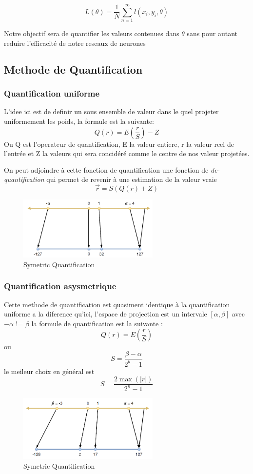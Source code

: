 \documentclass[twoside,twocolumn]{article}
\begin{document}
\[ L(\theta) = \frac{1}{N} \sum_{n=1}^\infty l(x_{i}, y_{i}, \theta)\]

Notre objectif sera de quantifier les valeurs contenues dans $\theta$ sans pour autant reduire l'efficacité de notre reseaux de neurones

\subsection{Methode de Quantification}
\subsubsection{Quantification uniforme}
L'idee ici est de definir un sous ensemble de valeur dans le quel projeter uniformement les poids, la formule est la suivante\cite{DBLP:journals/corr/abs-2004-09602}:
\[ Q(r) = E(\frac{r}{S}) - Z\]
Ou Q est l'operateur de quantification, E la valeur entiere, r la valeur reel de l'entrée et Z la valeurs qui sera concidéré comme le centre de nos valeur projetées.

On peut adjoindre à cette fonction de quantification une fonction de \textit{de-quantification} qui permet de revenir à une estimation de la valeur vraie
\[ \vec{r} = S(Q(r) + Z)\]

\begin{figure}[h]
  \centering
  \includegraphics[width=70mm]{simetrycQuantization.png}
  \caption{Symetric Quantification}
  \label{Symetric Quantification}
\end{figure}

\subsubsection{Quantification asysmetrique}
Cette methode de quantification est quasiment identique à la quantification uniforme a la diference qu'ici, l'espace de projection est un intervale $[\alpha, \beta]$ avec $-\alpha$ != $\beta$
la formule de quantification est la suivante \cite{DBLP:journals/corr/abs-2004-09602}:
\[ Q(r) = E(\frac{r}{S})\]
ou 
\[ S = \frac{\beta-\alpha}{2^{b}-1} \]
le meileur choix en général est 
\[S = \frac{2\max(|r|)}{2^{n}-1}\]
\begin{figure}[h]
  \centering
  \includegraphics[width=70mm]{asym_.png}
  \caption{Symetric Quantification}
  \label{Quantification Assimetrique}
\end{figure}
\end{document}
